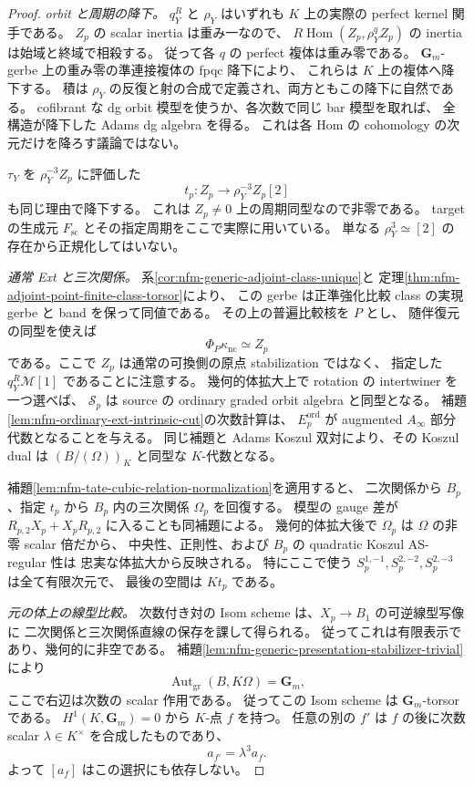 \begin{proof}
\emph{orbit と周期の降下。}
$q_Y^R$ と $\rho_Y$ はいずれも $K$ 上の実際の perfect kernel 関手である。
$Z_p$ の scalar inertia は重み一なので、
$R\operatorname{Hom}(Z_p,\rho_Y^qZ_p)$ の inertia は始域と終域で相殺する。
従って各 $q$ の perfect 複体は重み零である。
$\mathbf G_m$-gerbe 上の重み零の準連接複体の fpqc 降下により、
これらは $K$ 上の複体へ降下する。
積は $\rho_Y$ の反復と射の合成で定義され、両方ともこの降下に自然である。
cofibrant な dg orbit 模型を使うか、各次数で同じ bar 模型を取れば、
全構造が降下した Adams dg algebra を得る。
これは各 Hom の cohomology の次元だけを降ろす議論ではない。

$\tau_Y$ を $\rho_Y^{-3}Z_p$ に評価した
\[
 t_p:Z_p\longrightarrow\rho_Y^{-3}Z_p[2]
\]
も同じ理由で降下する。
これは $Z_p\ne0$ 上の周期同型なので非零である。
target の生成元 $F_{\mathrm{sc}}$ とその指定周期をここで実際に用いている。
単なる $\rho_Y^3\simeq[2]$ の存在から正規化してはいない。

\emph{通常 Ext と三次関係。}
系\ref{cor:nfm-generic-adjoint-class-unique}と
定理\ref{thm:nfm-adjoint-point-finite-class-torsor}により、
この gerbe は正準強化比較 class の実現 gerbe と band を保って同値である。
その上の普遍比較核を $P$ とし、
随伴復元の同型を使えば
\[
 \Phi_P\kappa_{\mathrm{nc}}\simeq Z_p
\]
である。ここで $Z_p$ は通常の可換側の原点 stabilization ではなく、
指定した $q_Y^R\mathcal M[1]$ であることに注意する。
幾何的体拡大上で rotation の intertwiner を一つ選べば、
$\mathcal S_p$ は source の ordinary graded orbit algebra と同型となる。
補題\ref{lem:nfm-ordinary-ext-intrinsic-cut}の次数計算は、
$E_p^{\mathrm{ord}}$ が augmented $A_\infty$ 部分代数となることを与える。
同じ補題と Adams Koszul 双対により、その Koszul dual は
$(B/(\Omega))_{\overline K}$ と同型な $K$-代数となる。

補題\ref{lem:nfm-tate-cubic-relation-normalization}を適用すると、
二次関係から $B_p$、指定 $t_p$ から $B_p$ 内の三次関係 $\Omega_p$ を回復する。
模型の gauge 差が $R_{p,2}X_p+X_pR_{p,2}$ に入ることも同補題による。
幾何的体拡大後で $\Omega_p$ は $\Omega$ の非零 scalar 倍だから、
中央性、正則性、および $B_p$ の quadratic Koszul AS-regular 性は
忠実な体拡大から反映される。
特にここで使う $
 S_p^{1,-1},S_p^{2,-2},S_p^{2,-3}$ は全て有限次元で、
最後の空間は $Kt_p$ である。

\emph{元の体上の線型比較。}
次数付き対の Isom scheme は、$X_p\to B_1$ の可逆線型写像に
二次関係と三次関係直線の保存を課して得られる。
従ってこれは有限表示であり、幾何的に非空である。
補題\ref{lem:nfm-generic-presentation-stabilizer-trivial}により
\[
 \operatorname{Aut}_{\mathrm{gr}}(B,K\Omega)=\mathbf G_m,
\]
ここで右辺は次数の scalar 作用である。
従ってこの Isom scheme は $\mathbf G_m$-torsor である。
$H^1(K,\mathbf G_m)=0$ から $K$-点 $f$ を持つ。
任意の別の $f'$ は $f$ の後に次数 scalar $\lambda\in K^\times$ を合成したものであり、
\[
 a_{f'}=\lambda^3a_f.
\]
よって $[a_f]$ はこの選択にも依存しない。


\end{proof}
